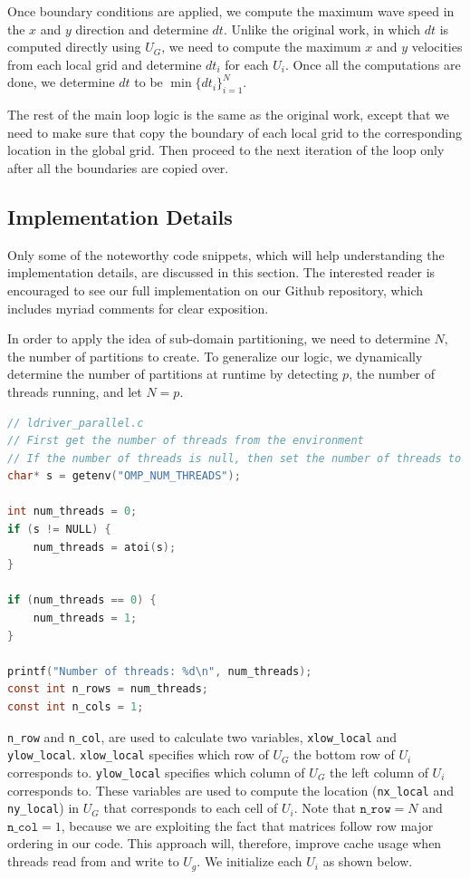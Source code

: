 \documentclass{article}
\begin{document}
Once boundary conditions are applied, we compute the maximum wave speed in the $x$ and $y$ direction and determine $dt$. Unlike the original work, in which $dt$ is computed directly using $U_G$, we need to compute the maximum $x$ and $y$ velocities from each local grid and determine $dt_i$ for each $U_i$. Once all the computations are done, we determine $dt$ to be $\min\{dt_i\}_{i=1}^N$.

The rest of the main loop logic is the same as the original work, except that we need to make sure that copy the boundary of each local grid to the corresponding location in the global grid. Then proceed to the next iteration of the loop only after all the boundaries are copied over.

\subsection{Implementation Details}

Only some of the noteworthy code snippets, which will help understanding the implementation details, are discussed in this section. The interested reader is encouraged to see our full implementation on our Github repository, which includes myriad comments for clear exposition.

In order to apply the idea of sub-domain partitioning, we need to determine $N$, the number of partitions to create. To generalize our logic, we dynamically determine the number of partitions at runtime by detecting $p$, the number of threads running, and let $N = p$.


\begin{lstlisting}[language=C]
// ldriver_parallel.c
// First get the number of threads from the environment
// If the number of threads is null, then set the number of threads to 1
char* s = getenv("OMP_NUM_THREADS");

int num_threads = 0;
if (s != NULL) {
    num_threads = atoi(s);
}

if (num_threads == 0) {
    num_threads = 1;
}

printf("Number of threads: %d\n", num_threads);
const int n_rows = num_threads;
const int n_cols = 1;
\end{lstlisting}

\texttt{n\_row} and \texttt{n\_col}, are used to calculate two variables, \texttt{xlow\_local} and \texttt{ylow\_local}.
\texttt{xlow\_local} specifies which row of $U_G$ the bottom row of $U_i$ corresponds to. \texttt{ylow\_local} specifies which column of $U_G$ the left column of $U_i$ corresponds to.
These variables are used to compute the location (\texttt{nx\_local} and \texttt{ny\_local}) in $U_G$ that corresponds to each cell of $U_i$.
Note that $\texttt{n\_row} = N$ and $\texttt{n\_col} = 1$, because we are exploiting the fact that matrices follow row major ordering in our code. This approach will, therefore, improve cache usage when threads read from and write to $U_g$. We initialize each $U_i$ as shown below.
\end{document}
